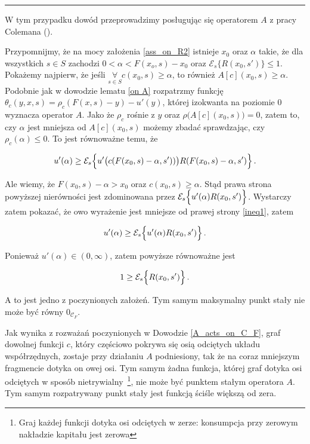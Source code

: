 \hrule
\begin{dowod}\label{proof_existence_of_a_fp}
\end{dowod}


W tym przypadku dowód przeprowadzimy posługując się operatorem $A$ z pracy Colemana (\citeyear{Coleman1}). 

	Przypomnijmy, że na mocy założenia \ref{ass_on_R2} istnieje $x_0$ oraz $\alpha$ takie, że dla wszystkich $s\in S $ zachodzi $0 < \alpha < F(x_o, s) - x_0$ oraz $\mathcal{E}_s \bigl \{ R(x_0,s')	\bigl \} \leq 1 $. Pokażemy najpierw, że jeśli $\underset{s \in S}{\forall} c(x_0, s) \geq \alpha$, to również $A[c](x_0, s) \geq \alpha$. Podobnie jak w dowodzie lematu \ref{on A} rozpatrzmy funkcję $ \theta_c (y,x,s) =  \rho_c (F(x,s) - y) - u'(y)$, której izokwanta na poziomie $0$ wyznacza operator $A$. Jako że $\rho_c$ rośnie z $y$ oraz $\rho \bigl( A[c](x_0,s) \bigl) = 0$, zatem to, czy $\alpha$ jest mniejsza od $A[c](x_0,s)$ możemy zbadać sprawdzając, czy $\rho_c (\alpha) \leq 0 $. To jest równoważne temu, że
	
\begin{equation}\label{ineq1}
	u'(\alpha) \geq \mathcal{E}_s \Bigl \{ u'\bigl(c(F(x_0,s) - \alpha, s')) \bigl) R(F(x_0,s) - \alpha,s')	\Bigl \}\,.
\end{equation} 

Ale wiemy, że $F(x_0, s) - \alpha > x_0$ oraz $c(x_0, s) \geq \alpha$. Stąd prawa strona powyższej nierówności jest zdominowana przez $\mathcal{E}_s \Bigl \{ u'(\alpha)R(x_0,s')\Bigl \}$. Wystarczy zatem pokazać, że owo wyrażenie jest mniejsze od prawej strony \ref{ineq1}, zatem 

$$ u'(\alpha) \geq \mathcal{E}_s \Bigl \{ u'(\alpha)R(x_0,s')\Bigl \}\,.$$

Ponieważ $u'(\alpha) \in (0, \infty)$, zatem powyższe równoważne jest

$$ 1 \geq  \mathcal{E}_s \Bigl \{R(x_0,s')\Bigl \}\,.$$

A to jest jedno z poczynionych założeń. Tym samym maksymalny punkt stały nie może być równy $0_{\mathcal{C}_F}$.

Jak wynika z rozważań poczynionych w Dowodzie \ref{A_acts_on_C_F}, graf dowolnej funkcji $c$, który częściowo pokrywa się osią odciętych układu współrzędnych,  zostaje przy działaniu $A$ podniesiony, tak że na coraz mniejszym fragmencie dotyka on owej osi. Tym samym żadna funkcja, której graf dotyka osi odciętych w sposób nietrywialny~\footnote{Graj każdej funkcji dotyka osi odciętych w zerze: konsumpcja przy zerowym nakładzie kapitału jest zerowa}, nie może być punktem stałym operatora $A$. Tym samym rozpatrywany punkt stały jest funkcją ściśle większą od zera.  


